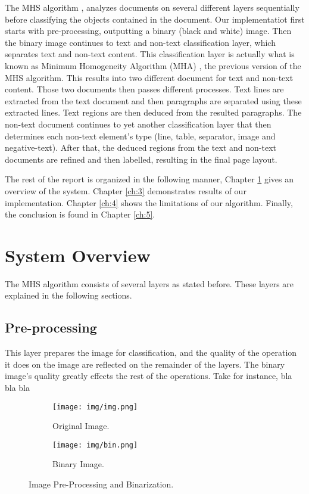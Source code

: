 \documentclass[12pt]{report}
\begin{document}
    The MHS algorithm \cite{mhs}, analyzes documents on several different layers sequentially before classifying the
    objects contained in the document.
    Our implementatiot first starts with pre-processing, outputting a binary (black and white) image.
    Then the binary image continues to text and non-text classification layer, which separates text and non-text
    content.
    This classification layer is actually what is known as Minimum Homogeneity Algorithm (MHA) \cite{mha}, the previous version
    of the MHS algorithm.
    This results into two different document for text and non-text content.
    Those two documents then passes different processes.
    Text lines are extracted from the text document and then paragraphs are separated using these extracted lines.
    Text regions are then deduced from the resulted paragraphs.
    The non-text document continues to yet another classification layer that then determines each non-text element's
    type (line, table, separator, image and negative-text).
    After that, the deduced regions from the text and non-text documents are refined and then labelled, resulting in
    the final page layout.

    The rest of the report is organized in the following manner, Chapter \ref{ch:2} gives an overview of the system.
    Chapter \ref{ch:3} demonstrates results of our implementation.
    Chapter \ref{ch:4} shows the limitations of our algorithm.
    Finally, the conclusion is found in Chapter \ref{ch:5}.


    \chapter{System Overview}\label{ch:2}

    The MHS algorithm consists of several layers as stated before.
    These layers are explained in the following sections.


    \section{Pre-processing}

    This layer prepares the image for classification, and the quality of the operation it does on the image are reflected
    on the remainder of the layers.
    The binary image's quality greatly effects the rest of the operations.
    Take for instance, bla bla bla

    \begin{figure}
        \centering
        \begin{subfigure}[b]{0.45\textwidth}
            \centering
            \texttt{[image: img/img.png]}
            \caption{Original Image.}
            \label{img:org}
        \end{subfigure}
        \hfill
        \begin{subfigure}[b]{0.45\textwidth}
            \centering
            \texttt{[image: img/bin.png]}
            \caption{Binary Image.}
            \label{img:bin}
        \end{subfigure}
        \caption{Image Pre-Processing and Binarization.}
        \label{fig:bin}
   \end{figure}
\end{document}
